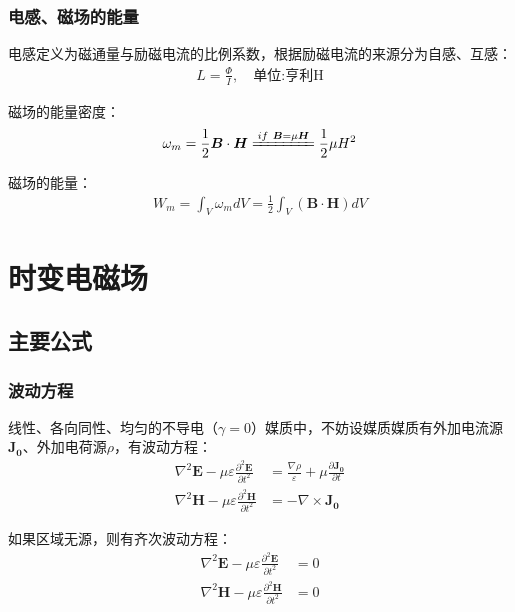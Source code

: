 \documentclass[withoutpreface,bwprint]{cumcmthesis} %
\begin{document}
\subsubsection{电感、磁场的能量}
电感定义为磁通量与励磁电流的比例系数，根据励磁电流的来源分为自感、互感：
\begin{align}
    L = \frac{\varPhi}{I},\quad \mbox{单位:亨利H}
\end{align}

磁场的能量密度：
\begin{align}
    \omega_m = \frac{1}{2} \boldsymbol{B}\cdot \boldsymbol{H} \xlongequal{if\ \boldsymbol{B} = \mu \boldsymbol{H}} \frac{1}{2}\mu H^2
\end{align}

磁场的能量：
\begin{align}
    W_m = \int_V \omega_m dV = \frac{1}{2}\int_V (\boldsymbol{B}\cdot \boldsymbol{H}) dV
\end{align}

\newpage
\section{时变电磁场}

\subsection{主要公式}

\subsubsection{波动方程}
线性、各向同性、均匀的不导电（$\gamma=0$）媒质中，不妨设媒质媒质有外加电流源$\boldsymbol{J_0}$、外加电荷源$\rho$，有波动方程：
\begin{align}
    \nabla^2 \boldsymbol{E} - \mu \varepsilon \frac{\partial^2 \boldsymbol{E}}{\partial t^2} &= \frac{\nabla \rho}{\varepsilon} + \mu \frac{\partial \boldsymbol{J_0}}{\partial t} \\
    \nabla^2 \boldsymbol{H} - \mu \varepsilon \frac{\partial^2 \boldsymbol{H}}{\partial t^2} &= -\nabla \times \boldsymbol{J_0}
\end{align}

如果区域无源，则有齐次波动方程：
\begin{align}
    \nabla^2 \boldsymbol{E} - \mu \varepsilon \frac{\partial^2 \boldsymbol{E}}{\partial t^2} &= 0 \\
    \nabla^2 \boldsymbol{H} - \mu \varepsilon \frac{\partial^2 \boldsymbol{H}}{\partial t^2} &= 0
\end{align}
\end{document}
